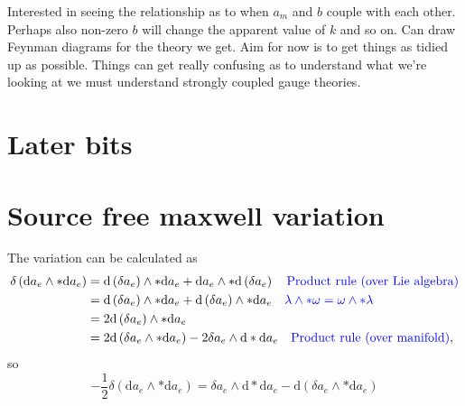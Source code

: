 \documentclass{article}
\begin{document}
Interested in seeing the relationship as to when $a_{m}$ and $b$ couple with each other. Perhaps also non-zero $b$ will change the apparent value of $k$ and so on. Can draw Feynman diagrams for the theory we get. Aim for now is to get things as tidied up as possible. Things can get really confusing as to understand what we're looking at we must understand strongly coupled gauge theories. 




\section{Later bits}





\appendix
\newpage
\section{Source free maxwell variation}
\label{appendixsourcefreemaxwell}
The variation can be calculated as
\begin{align}
    \delta\left(\mathrm{d}a_{e} \wedge * \mathrm{d}a_{e}\right) &= \mathrm{d}\left(\delta a_{e} \right)\wedge * \mathrm{d}a_{e} + \mathrm{d}a_{e}\wedge * \mathrm{d}\left(\delta a_{e} \right) \nonumber \color{blue}\quad \text{Product rule (over Lie algebra)} \color{black} \\
    &= \mathrm{d}\left(\delta a_{e} \right)\wedge * \mathrm{d}a_{e} + \mathrm{d}\left(\delta a_{e} \right)\wedge *\mathrm{d}a_{e}\nonumber\color{blue}\quad \lambda\wedge * \omega  = \omega \wedge * \lambda\color{black}\\
    &= 2\mathrm{d}\left(\delta a_{e}\right)\wedge * \mathrm{d}a_{e}\nonumber \\
    &= 2\mathrm{d}\left(\delta a_{e}\wedge * \mathrm{d}a_{e} \right) - 2 \delta a_{e}\wedge \mathrm{d}*\mathrm{d}a_{e}\nonumber\quad \color{blue} \text{Product rule (over manifold)} \color{black},
\end{align}
so
\begin{equation}
    \boxed{
    -\frac{1}{2}\delta\left(\mathrm{d}a_{e} \wedge * \mathrm{d}a_{e}\right) = \delta a_{e}\wedge \mathrm{d}*\mathrm{d}a_{e} - \mathrm{d}\left(\delta a_{e}\wedge *\mathrm{d}a_{e} \right)
    }
\end{equation}
\end{document}
